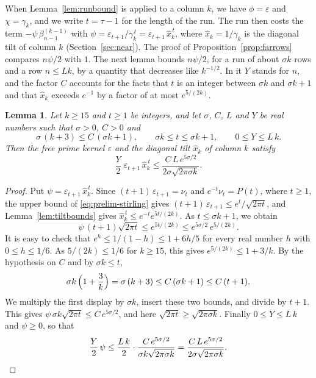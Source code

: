 \documentclass{amsart}
\newtheorem{lemma}[theorem]{Lemma}
\theoremstyle{definition}
\theoremstyle{remark}
\numberwithin{equation}{section}
\begin{document}
When Lemma~\ref{lem:runbound} is applied to a column $k$, we have
$\phi=\varepsilon$ and $\chi=\gamma_k$, and we write $t=\tau-1$ for the
length of the run. The run then costs the term
$-\psi\,\beta^{(k-1)}_{n-1}$ with
$\psi=\varepsilon_{t+1}/\gamma_k^{\,t}=\varepsilon_{t+1}\,\hat x_k^{\,t}$,
where $\hat x_k=1/\gamma_k$ is the diagonal tilt of column $k$
(Section~\ref{sec:near}). The proof of Proposition~\ref{prop:farrows}
compares $n\psi/2$ with $1$. The next lemma bounds $n\psi/2$, for a run of about $\sigma k$
rows and a row $n\le Lk$, by a quantity that decreases like $k^{-1/2}$. In
it $Y$ stands for $n$, and the factor $C$ accounts for the facts that $t$ is
an integer between $\sigma k$ and $\sigma k+1$ and that $\hat x_k$ exceeds
$e^{-1}$ by a factor of at most $e^{5/(2k)}$.

\begin{lemma}\label{lem:lossterm}
Let $k\ge15$ and $t\ge1$ be integers, and let $\sigma$, $C$, $L$ and $Y$ be
real numbers such that $\sigma>0$, $C>0$ and
\[
\sigma\,(k+3)\le C\,(\sigma k+1),\qquad
\sigma k\le t\le\sigma k+1,\qquad
0\le Y\le L\,k .
\]
Then the free prime kernel $\varepsilon$ and the diagonal tilt $\hat x_k$ of
column $k$ satisfy
\[
\frac Y2\;\varepsilon_{t+1}\,\hat x_k^{\,t}
\le\frac{C\,L\,e^{5\sigma/2}}{2\sigma\sqrt{2\pi\sigma k}}.
\]
\end{lemma}

\begin{proof}
Put $\psi=\varepsilon_{t+1}\,\hat x_k^{\,t}$.
Since $(t+1)\,\varepsilon_{t+1}=\nu_t$ and $e^{-t}\nu_t=P(t)$, where
$t\ge1$, the upper bound of \eqref{eq:prelim-stirling} gives
$(t+1)\,\varepsilon_{t+1}\le e^{t}/\sqrt{2\pi t}$, and
Lemma~\ref{lem:tiltbounds} gives $\hat x_k^{\,t}\le e^{-t}e^{5t/(2k)}$. As
$t\le\sigma k+1$, we obtain
\[
\psi\,(t+1)\sqrt{2\pi t}\le e^{5t/(2k)}\le e^{5\sigma/2}\,e^{5/(2k)} .
\]
It is easy to check that $e^{h}\le1/(1-h)\le1+6h/5$ for every real number
$h$ with $0\le h\le1/6$. As $5/(2k)\le1/6$ for $k\ge15$, this gives
$e^{5/(2k)}\le1+3/k$. By the hypothesis on $C$ and by $\sigma k\le t$,
\[
\sigma k\,\Bigl(1+\frac3k\Bigr)=\sigma\,(k+3)\le C\,(\sigma k+1)\le C\,(t+1).
\]
We multiply the first display by $\sigma k$, insert these two bounds, and
divide by $t+1$. This gives
$\psi\,\sigma k\sqrt{2\pi t}\le C\,e^{5\sigma/2}$, and here
$\sqrt{2\pi t}\ge\sqrt{2\pi\sigma k}$. Finally $0\le Y\le L\,k$ and
$\psi\ge0$, so that
\[
\frac Y2\,\psi\le\frac{L\,k}{2}\cdot
\frac{C\,e^{5\sigma/2}}{\sigma k\sqrt{2\pi\sigma k}}
=\frac{C\,L\,e^{5\sigma/2}}{2\sigma\sqrt{2\pi\sigma k}} .\qedhere
\]
\end{proof}
\end{document}
